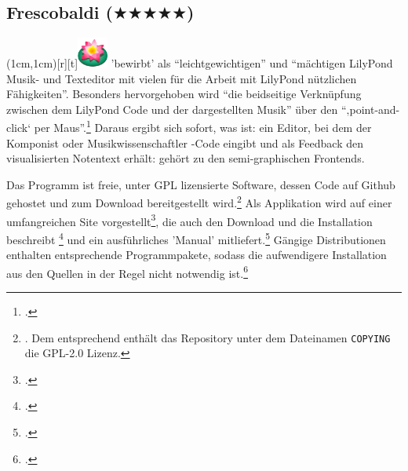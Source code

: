 %
%
%



\subsection{Frescobaldi ($\bigstar\bigstar\bigstar\bigstar\bigstar$)}

\parpic(1cm,1cm)[r][t]{\includegraphics[width=1cm]{logos/frescobaldi-300dpi.png}}
\label{Frescobaldi} 'bewirbt'  als
\enquote{leichtgewichtigen} und \enquote{mächtigen LilyPond Musik- und
Texteditor mit vielen für die Arbeit mit LilyPond nützlichen Fähigkeiten}.
Besonders hervorgehoben wird \enquote{die beidseitige Verknüpfung zwischen dem
LilyPond Code und der dargestellten Musik} über den \enquote{‚point-and-click‘
per Maus}.\footcite[vgl.][\nopage wp.]{LilyPond2018g} Daraus ergibt sich sofort,
was  ist: ein Editor, bei dem der Komponist oder
Musikwissenschaftler -Code eingibt und als Feedback den
visualisierten Notentext erhält:  gehört zu den
semi-graphischen Frontends.

Das Programm ist freie, unter GPL lizensierte Software, dessen Code auf Github
ge\-hos\-tet und zum Download bereitgestellt wird.\footnote{\cite[vgl.][\nopage
wp.]{Frescobaldi2019a}. Dem entsprechend enthält das Repository unter dem
Dateinamen \texttt{COPYING} die GPL-2.0 Lizenz.} Als Applikation wird
 auf einer umfangreichen Site vorgestellt\footcite[vgl.][\nopage
wp.]{Frescobaldi2017a}, die auch den Download und die Installation beschreibt
\footcite[vgl.][\nopage wp.]{Frescobaldi2015a} und ein ausführliches 'Manual'
mitliefert.\footcite[vgl.][\nopage wp.]{Frescobaldi2012a} Gängige Distributionen
enthalten entsprechende Programmpakete, sodass die aufwendigere Installation aus
den Quellen in der Regel nicht notwendig ist.\footcite[vgl.][\nopage
wp.]{UbuntuFrescobaldi2016a}

